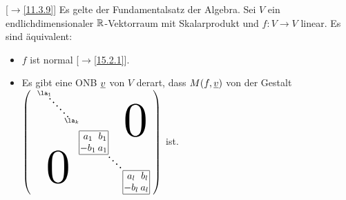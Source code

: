 \documentclass[../../main.tex]{subfiles}
\begin{document}
\begin{sat}\mbox{}[$\to$\ref{11.3.9}]
\label{15.2.10}
Es gelte der Fundamentalsatz der Algebra. Sei $V$ ein endlichdimensionaler $\mathbb R$-Vektorraum mit Skalarprodukt und $f: V\to V$ linear. Es sind äquivalent:
\begin{itemize}[\normalfont(a)]
\item $f$ ist normal [$\to$\ref{15.2.1}].
\item Es gibt eine ONB ${\underline v}$ von $V$ derart, dass $M(f,{\underline v})$ von der Gestalt\\ $\left(\begin{smallmatrix}~
\begin{tikzpicture}[inner sep=0]
\node (a) {$\begin{smallmatrix}\la_1\end{smallmatrix}$};
\node (b) at (1,-1) {$\begin{smallmatrix}\la_k\end{smallmatrix}$};
\node (c) at (1.8,-1.8) {$\arraycolsep=1pt\begin{smallmatrix}\begin{array}{|cc|}\hline a_1&b_1\\-b_1&a_1\\\hline\end{array}\end{smallmatrix}$};
\node (d) at (2.8,-2.8) [anchor=north west] {$\arraycolsep=1.1pt\begin{smallmatrix}\begin{array}{|cc|}\hline a_l&b_l\\-b_l&a_l\\\hline\end{array}\end{smallmatrix}$};
\node[scale=5, xshift=0.6cm, yshift=-0.2cm] at (a.east) {$0$};
\node[scale=5] at (0.5,-2.7) {$0$};
\draw[loosely dotted,very thick,dash phase=2pt] (c)--(d);
\draw[loosely dotted,very thick,dash phase=2pt] (a)--(b);
\end{tikzpicture}
\end{smallmatrix}\right)$ ist.
\end{itemize}
\end{sat}
\end{document}
